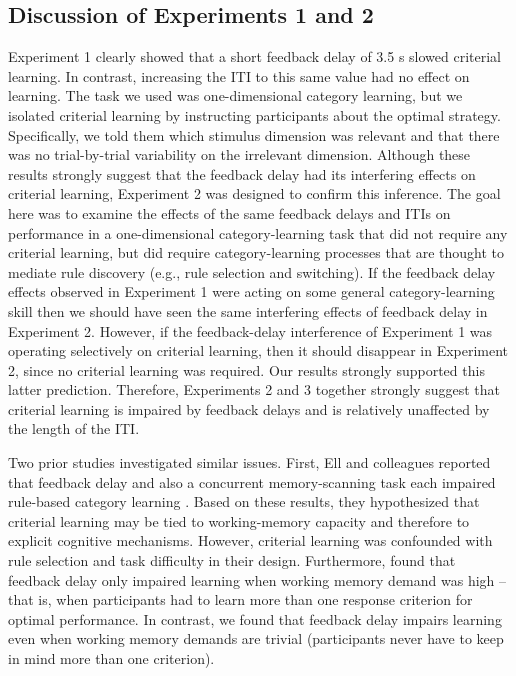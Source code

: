 \documentclass[doc, floatsintext]{apa7}
\begin{document}
\subsection{Discussion of Experiments 1 and 2}
Experiment 1 clearly showed that a short feedback delay of
3.5 s slowed criterial learning. In contrast, increasing the
ITI to this same value had no effect on learning. The task
we used was one-dimensional category learning, but we
isolated criterial learning by instructing participants
about the optimal strategy. Specifically, we told them which
stimulus dimension was relevant and that there was no
trial-by-trial variability on the irrelevant dimension.
Although these results strongly suggest that the feedback
delay had its interfering effects on criterial learning,
Experiment 2 was designed to confirm this inference. The
goal here was to examine the effects of the same feedback
delays and ITIs on performance in a one-dimensional
category-learning task that did not require any criterial
learning, but did require category-learning processes that
are thought to mediate rule discovery (e.g., rule selection
and switching). If the feedback delay effects observed in
Experiment 1 were acting on some general category-learning
skill then we should have seen the same interfering effects
of feedback delay in Experiment 2. However, if the
feedback-delay interference of Experiment 1 was operating
selectively on criterial learning, then it should disappear
in Experiment 2, since no criterial learning was required.
Our results strongly supported this latter prediction.
Therefore, Experiments 2 and 3 together strongly suggest
that criterial learning is impaired by feedback delays and
is relatively unaffected by the length of the ITI.

Two prior studies investigated similar issues. First, Ell
and colleagues reported that feedback delay and also a
concurrent memory-scanning task each impaired rule-based
category learning \parencite{ell2009critrial}. Based on
these results, they hypothesized that criterial learning may
be tied to working-memory capacity and therefore to explicit
cognitive mechanisms. However, criterial learning was
confounded with rule selection and task difficulty in their
design.  Furthermore, \textcite{ell2009critrial} found that
feedback delay only impaired learning when working memory
demand was high -- that is, when participants had to learn
more than one response criterion for optimal performance. In
contrast, we found that feedback delay impairs learning even
when working memory demands are trivial (participants never
have to keep in mind more than one criterion).
\end{document}
